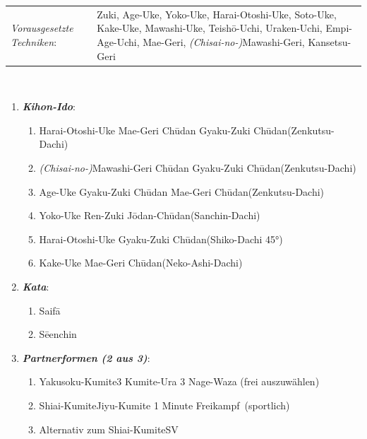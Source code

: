 \documentclass[a5paper,landscape,DIV=calc,11pt,notitlepage]{scrartcl}
\newcommand{\bull}{\,\textbullet\,}
\begin{document}
\pagebreak
\begin{tcolorbox}[colback=white,colframe=BLBELT,coltitle=white,title=4. Kyu: Blau]
	\renewcommand{\labelenumi}{\alph{enumi}.)}
	\renewcommand{\labelenumii}{\arabic*.}
	{\scriptsize
		\begin{tabularx}{\textwidth}{lX}
			\textit{Vorausgesetzte Techniken}:& Zuki, Age-Uke, Yoko-Uke, Harai-Otoshi-Uke, Soto-Uke, Kake-Uke, Mawashi-Uke, Teish\={o}-Uchi, Uraken-Uchi, \mbox{Empi-Age-Uchi}, Mae-Geri, \textit{(Chisai-no-)}Mawashi-Geri, Kansetsu-Geri
		\end{tabularx}\\}\vspace{12pt}
	\begin{enumerate}[nosep]
		\item \textit{\textbf{Kihon-Ido}}:
		\begin{enumerate}[nosep]
			\item Harai-Otoshi-Uke\bull Mae-Geri Ch\={u}dan\bull Gyaku-Zuki Ch\={u}dan\tabto{280pt}(Zenkutsu-Dachi)
			\item \textit{(Chisai-no-)}Mawashi-Geri Ch\={u}dan\bull Gyaku-Zuki Ch\={u}dan\tabto{280pt}(Zenkutsu-Dachi)
			\item Age-Uke\bull Gyaku-Zuki Ch\={u}dan\bull Mae-Geri Ch\={u}dan\tabto{280pt}(Zenkutsu-Dachi)
			\item Yoko-Uke\bull Ren-Zuki J\={o}dan-Ch\={u}dan\tabto{280pt}(Sanchin-Dachi)
			\item Harai-Otoshi-Uke\bull Gyaku-Zuki Ch\={u}dan\tabto{280pt}(Shiko-Dachi 45°)
			\item Kake-Uke\bull Mae-Geri Ch\={u}dan\tabto{280pt}(Neko-Ashi-Dachi)
		\end{enumerate}\vspace{24pt}
		\item \textit{\textbf{Kata}}:
		\begin{enumerate}[nosep]
			\item Saif\={a}
			\item S\={e}enchin
		\end{enumerate}\vspace{24pt}
		\item \textit{\textbf{Partnerformen (2 aus 3)}}:
		\begin{enumerate}[nosep]
			\item Yakusoku-Kumite\tabto{200pt}3 Kumite-Ura\bull 3 Nage-Waza (frei auszuwählen)
			\item Shiai-Kumite\tabto{200pt}Jiyu-Kumite 1 Minute \frqq Freikampf\flqq~(sportlich)
			\item Alternativ zum Shiai-Kumite\tabto{200pt}SV
		\end{enumerate}
	\end{enumerate}
\end{tcolorbox}
\end{document}
